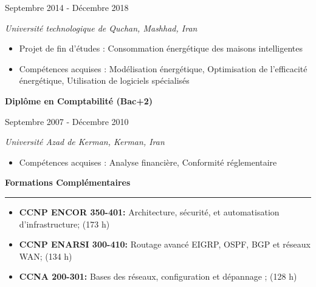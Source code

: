 \documentclass[a4paper]{letter}
\newcommand{\divider}{\rule{\linewidth}{0.9pt}}
\begin{document}
\begin{minipage}[t]{0.60\textwidth}
{\footnotesize Septembre 2014 - Décembre 2018}

{\textit{Université technologique de Quchan, Mashhad, Iran}}

\vspace{1mm}

\begin{itemize}
    \footnotesize
    \item Projet de fin d'études : Consommation énergétique des maisons intelligentes
    \item Compétences acquises : Modélisation énergétique, Optimisation de l'efficacité énergétique, Utilisation de logiciels spécialisés
\end{itemize}

\vspace{3mm}

{\textbf{Diplôme en Comptabilité (Bac+2)}}

{\footnotesize Septembre 2007 - Décembre 2010}

{\textit{Université Azad de Kerman, Kerman, Iran}}

\vspace{1mm}
\begin{itemize}


    \footnotesize
    \item Compétences acquises : Analyse financière, Conformité réglementaire
\end{itemize}
\vspace{3mm}

{\large \textbf{Formations Complémentaires}}
\divider
\vspace{4mm}
\begin{itemize}
    \footnotesize \item {\textbf{CCNP ENCOR 350-401:} Architecture, sécurité, et automatisation d'infrastructure; (173 h)}
    \vspace{2mm}
    \footnotesize \item {\textbf{CCNP ENARSI 300-410:} Routage avancé EIGRP, OSPF, BGP et réseaux WAN; (134 h)}
    \vspace{2mm}
    \footnotesize \item {\textbf{CCNA 200-301:} Bases des réseaux, configuration et dépannage ; (128 h)}
\end{itemize}
\vspace{3mm}







\end{minipage}
\end{document}
